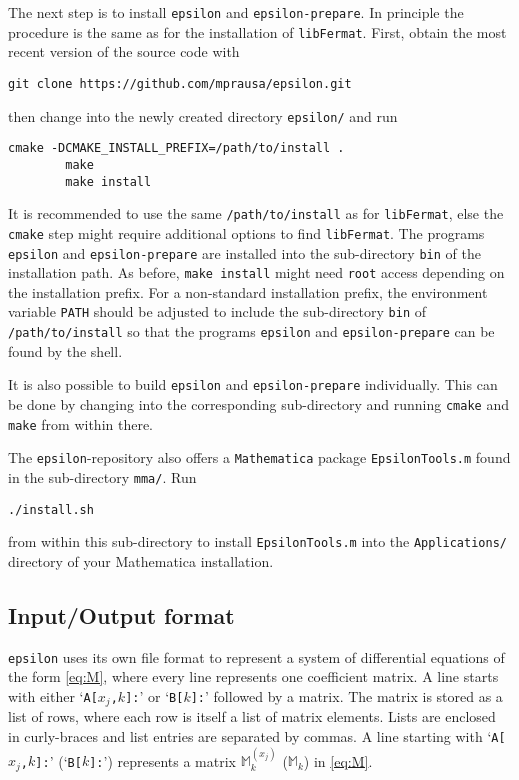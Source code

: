 \documentclass[12pt]{article}
\numberwithin{equation}{section}
\numberwithin{figure}{section}
\newcommand{\M}{\mathds{M}}
\begin{document}
      The next step is to install \texttt{epsilon} and \texttt{epsilon-prepare}.
      In principle the procedure is the same as for the installation of \texttt{libFermat}.
      First, obtain the most recent version of the source code with
      \begin{lstlisting}[basicstyle=\ttfamily,xleftmargin=-4em]
        git clone https://github.com/mprausa/epsilon.git
      \end{lstlisting}
      then change into the newly created directory \texttt{epsilon/} and run
      \begin{lstlisting}[basicstyle=\ttfamily,xleftmargin=-4em]
        cmake -DCMAKE_INSTALL_PREFIX=/path/to/install .
        make
        make install
      \end{lstlisting}
      It is recommended to use the same \texttt{/path/to/install} as for \texttt{libFermat}, else the \texttt{cmake} step might require additional options to find \texttt{libFermat}.
      The programs \texttt{epsilon} and \texttt{epsilon-prepare} are installed into the sub-directory \texttt{bin} of the installation path.
      As before, \texttt{make install} might need \texttt{root} access depending on the installation prefix.
      For a non-standard installation prefix, the environment variable \texttt{PATH} should be adjusted to include the sub-directory \texttt{bin} of \texttt{/path/to/install} so that the programs \texttt{epsilon} and \texttt{epsilon-prepare} can be found by the shell.

      It is also possible to build \texttt{epsilon} and \texttt{epsilon-prepare} individually.
      This can be done by changing into the corresponding sub-directory and running \texttt{cmake} and \texttt{make} from within there.

      The \texttt{epsilon}-repository also offers a \texttt{Mathematica} package \texttt{EpsilonTools.m} found in the sub-directory \texttt{mma/}.
      Run
      \begin{lstlisting}[basicstyle=\ttfamily,xleftmargin=-4em]
        ./install.sh
      \end{lstlisting}
      from within this sub-directory to install \texttt{EpsilonTools.m} into the \texttt{Applications/} directory of your Mathematica installation.
    \subsection{Input/Output format} \label{sect:format}
      \texttt{epsilon} uses its own file format to represent a system of differential equations of the form \eqref{eq:M}, where every line represents one coefficient matrix.
      A line starts with either `\texttt{A[$x_j$,$k$]:}' or `\texttt{B[$k$]:}' followed by a matrix.
      The matrix is stored as a list of rows, where each row is itself a list of matrix elements.
      Lists are enclosed in curly-braces and list entries are separated by commas.
      A line starting with `\texttt{A[$x_j$,$k$]:}' (`\texttt{B[$k$]:}') represents a matrix $\M^{(x_j)}_k$ ($\M_k$) in \eqref{eq:M}.
\end{document}

